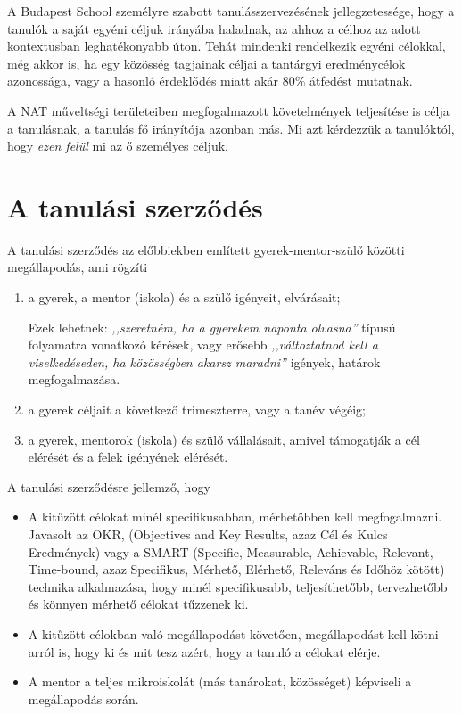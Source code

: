 A Budapest School személyre szabott tanulásszervezésének jellegzetessége, hogy a tanulók a saját egyéni céljuk irányába haladnak, az ahhoz a célhoz az adott kontextusban leghatékonyabb úton. Tehát mindenki rendelkezik egyéni célokkal, még akkor is, ha egy közösség tagjainak céljai a tantárgyi eredménycélok azonossága, vagy a hasonló érdeklődés miatt akár  80\% átfedést mutatnak.

A NAT műveltségi területeiben megfogalmazott követelmények teljesítése is célja a tanulásnak, a tanulás fő irányítója azonban más. Mi azt kérdezzük a tanulóktól, hogy \emph{ezen felül} mi az ő személyes céljuk.

\section{A tanulási szerződés}


A tanulási szerződés az előbbiekben említett gyerek-mentor-szülő közötti megállapodás, ami rögzíti
\begin{enumerate}
\item a gyerek, a mentor (iskola) és a szülő igényeit, elvárásait;

    Ezek lehetnek: \emph{,,szeretném, ha a gyerekem naponta olvasna''} típusú folyamatra vonatkozó kérések, vagy erősebb \emph{,,változtatnod kell a viselkedéseden, ha közösségben akarsz maradni''} igények, határok megfogalmazása.

\item a gyerek céljait a következő trimeszterre, vagy a tanév végéig;

\item a gyerek, mentorok (iskola) és szülő vállalásait, amivel támogatják a cél elérését és a felek igényének elérését.

\end{enumerate}

A tanulási szerződésre jellemző, hogy
\begin{itemize}
\item A kitűzött célokat minél specifikusabban, mérhetőbben kell megfogalmazni. Javasolt az OKR,  (Objectives and Key Results, azaz  Cél és Kulcs Eredmények) \citep{okr} vagy a SMART (Specific, Measurable, Achievable, Relevant, Time-bound, azaz Specifikus,  Mérhető, Elérhető, Releváns és Időhöz kötött) \citep{wiki:smart} technika alkalmazása, hogy minél specifikusabb, teljesíthetőbb, tervezhetőbb és könnyen mérhető célokat tűzzenek ki.

\item A kitűzött célokban való megállapodást követően, megállapodást  kell kötni arról is, hogy ki és mit tesz azért, hogy a tanuló a célokat elérje.

\item A mentor a teljes mikroiskolát (más tanárokat, közösséget) képviseli a megállapodás során.
\end{itemize}

